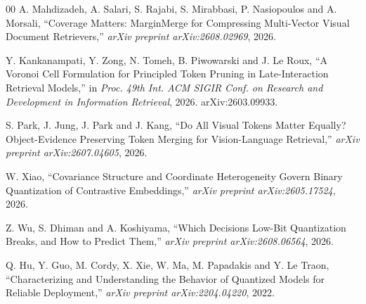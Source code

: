 \documentclass[conference]{IEEEtran}
\begin{document}
\begin{thebibliography}{00}
A. Mahdizadeh, A. Salari, S. Rajabi, S. Mirabbasi, P. Nasiopoulos and
A. Morsali, ``Coverage Matters: MarginMerge for Compressing Multi-Vector
Visual Document Retrievers,'' \emph{arXiv preprint arXiv:2608.02969}, 2026.

Y. Kankanampati, Y. Zong, N. Tomeh, B. Piwowarski and J. Le Roux, ``A Voronoi
Cell Formulation for Principled Token Pruning in Late-Interaction Retrieval
Models,'' in \emph{Proc. 49th Int. ACM SIGIR Conf. on Research and Development
in Information Retrieval}, 2026. arXiv:2603.09933.

S. Park, J. Jung, J. Park and J. Kang, ``Do All Visual Tokens Matter Equally?
Object-Evidence Preserving Token Merging for Vision-Language Retrieval,''
\emph{arXiv preprint arXiv:2607.04605}, 2026.

W. Xiao, ``Covariance Structure and Coordinate Heterogeneity Govern Binary
Quantization of Contrastive Embeddings,'' \emph{arXiv preprint
arXiv:2605.17524}, 2026.

Z. Wu, S. Dhiman and A. Koshiyama, ``Which Decisions Low-Bit Quantization
Breaks, and How to Predict Them,'' \emph{arXiv preprint arXiv:2608.06564},
2026.

Q. Hu, Y. Guo, M. Cordy, X. Xie, W. Ma, M. Papadakis and Y. Le Traon,
``Characterizing and Understanding the Behavior of Quantized Models for
Reliable Deployment,'' \emph{arXiv preprint arXiv:2204.04220}, 2022.

\end{thebibliography}
\end{document}
